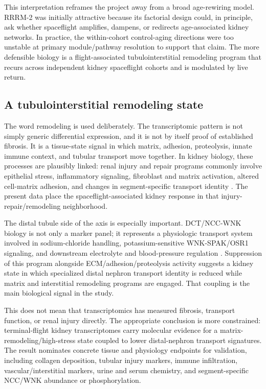 \documentclass[11pt]{article}
\begin{document}
This interpretation reframes the project away from a broad age-rewiring model. RRRM-2 was initially attractive because its factorial design could, in principle, ask whether spaceflight amplifies, dampens, or redirects age-associated kidney networks. In practice, the within-cohort control-aging directions were too unstable at primary module/pathway resolution to support that claim. The more defensible biology is a flight-associated tubulointerstitial remodeling program that recurs across independent kidney spaceflight cohorts and is modulated by live return.

\subsection{A tubulointerstitial remodeling state}

The word remodeling is used deliberately. The transcriptomic pattern is not simply generic differential expression, and it is not by itself proof of established fibrosis. It is a tissue-state signal in which matrix, adhesion, proteolysis, innate immune context, and tubular transport move together. In kidney biology, these processes are plausibly linked: renal injury and repair programs commonly involve epithelial stress, inflammatory signaling, fibroblast and matrix activation, altered cell-matrix adhesion, and changes in segment-specific transport identity \citep{liu2011fibrosis,natneph2024fibrosis,jci2024fibrosis,chavula2022cadherin}. The present data place the spaceflight-associated kidney response in that injury-repair/remodeling neighborhood.

The distal tubule side of the axis is especially important. DCT/NCC-WNK biology is not only a marker panel; it represents a physiologic transport system involved in sodium-chloride handling, potassium-sensitive WNK-SPAK/OSR1 signaling, and downstream electrolyte and blood-pressure regulation \citep{castaneda2024dct,ge2016wnk}. Suppression of this program alongside ECM/adhesion/proteolysis activity suggests a kidney state in which specialized distal nephron transport identity is reduced while matrix and interstitial remodeling programs are engaged. That coupling is the main biological signal in the study.

This does not mean that transcriptomics has measured fibrosis, transport function, or renal injury directly. The appropriate conclusion is more constrained: terminal-flight kidney transcriptomes carry molecular evidence for a matrix-remodeling/high-stress state coupled to lower distal-nephron transport signatures. The result nominates concrete tissue and physiology endpoints for validation, including collagen deposition, tubular injury markers, immune infiltration, vascular/interstitial markers, urine and serum chemistry, and segment-specific NCC/WNK abundance or phosphorylation.
\end{document}

